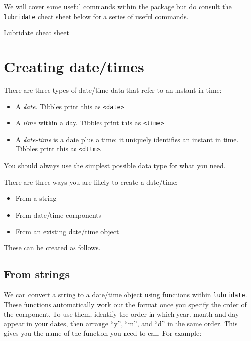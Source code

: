 \documentclass[
]{book}
\providecommand{\tightlist}{%
  \setlength{\itemsep}{0pt}\setlength{\parskip}{0pt}}
\begin{document}
We will cover some useful commands within the package but do consult the \texttt{lubridate} cheat sheet below for a series of useful commands.

\href{\%22https://rawgit.com/rstudio/cheatsheets/main/lubridate.pdf\%22}{Lubridate cheat sheet}

\hypertarget{creating-datetimes}{%
\section{Creating date/times}\label{creating-datetimes}}

There are three types of date/time data that refer to an instant in time:

\begin{itemize}
\tightlist
\item
  A \emph{date}. Tibbles print this as \texttt{\textless{}date\textgreater{}}
\item
  A \emph{time} within a day. Tibbles print this as \texttt{\textless{}time\textgreater{}}
\item
  A \emph{date-time} is a date plus a time: it uniquely identifies an instant in time. Tibbles print this as \texttt{\textless{}dttm\textgreater{}}.
\end{itemize}

You should always use the simplest possible data type for what you need.

There are three ways you are likely to create a date/time:

\begin{itemize}
\tightlist
\item
  From a string
\item
  From date/time components
\item
  From an existing date/time object
\end{itemize}

These can be created as follows.

\hypertarget{from-strings}{%
\subsection{From strings}\label{from-strings}}

We can convert a string to a date/time object using functions within \texttt{lubridate}. These functions automatically work out the format once you specify the order of the component. To use them, identify the order in which year, month and day appear in your dates, then arrange ``y'', ``m'', and ``d'' in the same order. This gives you the name of the function you need to call. For example:
\end{document}
